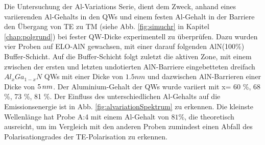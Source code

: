Die Untersuchung der Al-Variations Serie, dient dem Zweck, anhand eines variierenden Al-Gehalts in den QWs und einem festen Al-Gehalt in der Barriere den \"Ubergang von TE zu TM (siehe Abb. \ref{fig:simuchr} in Kapitel \ref{chap:polgrund}) bei fester QW-Dicke experimentell zu \"uberpr\"ufen. Dazu wurden vier Proben auf ELO-AlN gewachsen, mit einer darauf folgenden AlN(100\%) Buffer-Schicht. Auf die Buffer-Schicht folgt zuletzt die aktiven Zone, mit einem zwischen der ersten und letzten undotierten AlN-Barriere eingebetteten dreifach $Al_{x}Ga_{1-x}N$ QWs mit einer Dicke von $1.5nm$ und dazwischen AlN-Barrieren einer Dicke von $5 \thinspace nm$. Der Aluminium-Gehalt der QWs wurde variiert mit x= 60 \%, 68 \%, 73 \%, 81 \%. 
Der Einfluss des unterschiedlichen Al-Gehalts auf die Emissionsenergie ist in Abb. \ref{fig:alvariationSpektrum} zu erkennen. Die kleinste Wellenl\"ange hat Probe A:4 mit einem Al-Gehalt von $81\%$, die theoretisch ausreicht, um im Vergleich mit den anderen Proben zumindest einen Abfall des Polarisationgrades der TE-Polarisation zu erkennen.
%
